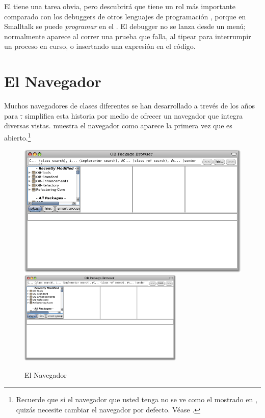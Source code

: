 \documentclass[spanish,a4paper,10pt,twoside]{book}
\begin{document}
El  tiene una tarea obvia, pero descubrir\'a que tiene un rol m\'as importante comparado con los debuggers de otros lenguajes de programaci\'on , porque en Smalltalk se puede \emph{programar} en el . El debugger no se lanza desde un men\'u; normalmente aparece al correr una prueba que falla, al tipear  para interrumpir un proceso en curso, o insertando una expresi\'on  en el c\'odigo.

\section{El Navegador}

Muchos navegadores de clases diferentes se han desarrollado a trev\'es de los a\~nos para \st.
\pharo simplifica esta historia por medio de ofrecer un navegador que integra diversas vistas.
 muestra el navegador como aparece la primera vez que es abierto.\footnote{Recuerde que si el navegador que usted tenga no se ve como el mostrado en , quiz\'as necesite cambiar el navegador por defecto.  V\'ease .}

\begin{figure}[htbp]
   \centering
   \ifluluelse
	 {\includegraphics[width=\textwidth]{SystemBrowser0} }
	 {\includegraphics[width=0.7\textwidth]{SystemBrowser0} }
   \caption{El Navegador}
\end{figure}
\end{document}

